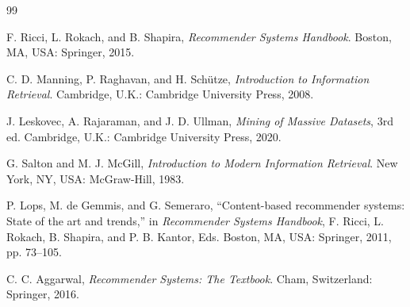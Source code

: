 \documentclass[conference]{IEEEtran}
\begin{document}
\begin{thebibliography}{99}

F. Ricci, L. Rokach, and B. Shapira, \emph{Recommender Systems Handbook}. Boston, MA, USA: Springer, 2015.

C. D. Manning, P. Raghavan, and H. Sch\"utze, \emph{Introduction to Information Retrieval}. Cambridge, U.K.: Cambridge University Press, 2008.

J. Leskovec, A. Rajaraman, and J. D. Ullman, \emph{Mining of Massive Datasets}, 3rd ed. Cambridge, U.K.: Cambridge University Press, 2020.

G. Salton and M. J. McGill, \emph{Introduction to Modern Information Retrieval}. New York, NY, USA: McGraw-Hill, 1983.

P. Lops, M. de Gemmis, and G. Semeraro, ``Content-based recommender systems: State of the art and trends,'' in \emph{Recommender Systems Handbook}, F. Ricci, L. Rokach, B. Shapira, and P. B. Kantor, Eds. Boston, MA, USA: Springer, 2011, pp. 73--105.

C. C. Aggarwal, \emph{Recommender Systems: The Textbook}. Cham, Switzerland: Springer, 2016.

\end{thebibliography}
\end{document}
